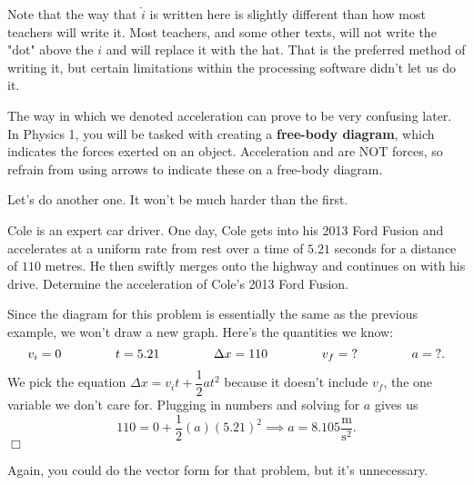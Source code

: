 \documentclass[lang=en,11pt]{elegantbook}
\begin{document}
\begin{remark}
Note that the way that $\hat{i}$ is written here is slightly different than how most teachers will write it.  Most teachers, and some other texts, will not write the "dot" above the $i$ and will replace it with the hat.  That is the preferred method of writing it, but certain limitations within the processing software didn't let us do it.
\end{remark}

\begin{note}
The way in which we denoted acceleration can prove to be very confusing later.  In Physics 1, you will be tasked with creating a \textbf{free-body diagram}, which indicates the forces exerted on an object.  Acceleration and are NOT forces, so refrain from using arrows to indicate these on a free-body diagram.   
\end{note}
Let's do another one.  It won't be much harder than the first.
\begin{example}
Cole is an expert car driver. One day, Cole gets into his 2013 Ford Fusion and accelerates at a uniform rate from rest over a time of $5.21$ seconds for a distance of $110$ metres.  He then swiftly merges onto the highway and continues on with his drive.  Determine the acceleration of Cole's 2013 Ford Fusion.
\end{example}
\begin{solution}
Since the diagram for this problem is essentially the same as the previous example, we won't draw a new graph.  Here's the quantities we know: $$v_i=0 \hspace{15mm} t=5.21 \hspace{15mm} \Delta x=110 \hspace{15mm} v_f=\text{?} \hspace{15mm} a=\text{?}.$$
We pick the equation $\Delta x=v_it+\dfrac{1}{2}at^2$ because it doesn't include $v_f$, the one variable we don't care for.  Plugging in numbers and solving for $a$ gives us $$110=0+\dfrac{1}{2}(a)(5.21)^2 \implies a=8.105\frac{\text{m}}{\text{s}^2}.$$ $\Box$
\end{solution}
Again, you could do the vector form for that problem, but it's unnecessary.
\end{document}

